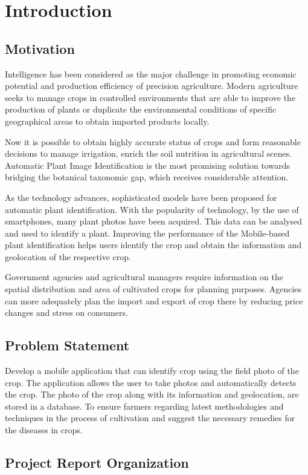 \documentclass[../Report.tex]{subfiles}
\begin{document}
\chapter{Introduction}

\section{Motivation}
Intelligence has been considered as the major challenge in promoting economic potential and production efficiency of precision
agriculture. Modern agriculture seeks to manage crops in controlled environments that are able to improve the production of plants or
duplicate the environmental conditions of specific geographical areas to obtain imported products locally. \par
Now it is possible to obtain highly accurate status of crops and form reasonable decisions to manage irrigation, enrich the soil
nutrition in agricultural scenes. Automatic Plant Image Identification is the most promising solution towards bridging the botanical
taxonomic gap, which receives considerable attention. \par
As the technology advances, sophisticated models have been proposed for automatic plant identification. With the popularity of technology, 
by the use of smartphones, many plant photos have been acquired. This data can be analysed and used to identify a plant. Improving the 
performance of the Mobile-based plant identification helps users identify the crop and obtain the information and geolocation of the 
respective crop.\par
Government agencies and agricultural managers require information on the spatial distribution and area of cultivated crops for planning 
purposes. Agencies can more adequately plan the import and export of crop there by reducing price changes and stress on consumers.

\section{Problem Statement}
Develop a mobile application that can identify crop using the field photo of the crop. The application allows the user to take photos 
and automatically detects the crop. The photo of the crop along with its information and geolocation, are stored in a database. To ensure 
farmers regarding latest methodologies and techniques in the process of cultivation and suggest the necessary remedies for the 
diseases in crops.\par


\section{Project Report Organization}
\end{document}
